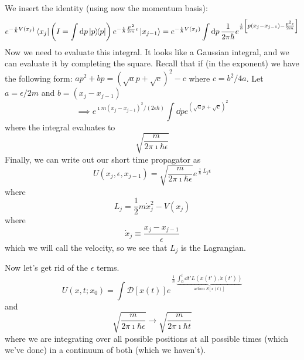 \documentclass[a4paper,twoside,master.tex]{subfiles}
\begin{document}
We insert the identity (using now the momentum basis):
\begin{equation}
    e^{- \frac{\imath}{\hbar} V(x_j)} \bra{x_j}\left( I = \int \dd{p} \op{p} \right) e^{- \frac{\imath}{\hbar} \frac{P^2}{2m} \epsilon} \ket{x_{j-1}} = e^{- \frac{\imath}{\hbar} V(x_j)} \int \dd{p} \frac{1}{2 \pi \hbar} e^{\frac{\imath}{\hbar} \left[ p(x_j-x_{j-1}) - \frac{p^2\epsilon}{2m} \right]}
\end{equation}
Now we need to evaluate this integral. It looks like a Gaussian integral, and we can evaluate it by completing the square. Recall that if (in the exponent) we have the following form: $ a p^2 + b p = (\sqrt{a} p + \sqrt{c})^2-c $ where $ c = b^2 / 4a $. Let $ a = \epsilon/2m $ and $ b = (x_j-x_{j-1}) $
\begin{equation}
    \implies e^{\imath m(x_j-x_{j-1})^2 / (2 \epsilon \hbar) } \int \dd{p} e^{(\sqrt{a} p + \sqrt{c})^2}
\end{equation}
where the integral evaluates to
\begin{equation}
    \sqrt{\frac{m}{2\pi\imath\hbar\epsilon}}
\end{equation}
Finally, we can write out our short time propagator as
\begin{equation}
    U(x_j,\epsilon,x_{j-1}) = \sqrt{\frac{m}{2\pi\imath\hbar\epsilon}} e^{ \frac{\imath}{\hbar} L_j \epsilon}
\end{equation}
where
\begin{equation}
    L_j = \frac{1}{2} m \dot{x}_j^2 - V(x_j)
\end{equation}
where
\begin{equation}
    \dot{x}_j \equiv \frac{x_j-x_{j-1}}{\epsilon}
\end{equation}
which we will call the velocity, so we see that $ L_j $ is the Lagrangian.

Now let's get rid of the $ \epsilon $ terms.
\begin{equation}
    U(x,t;x_0) = \int \mathscr{D}[x(t)] e^{\frac{\imath}{\hbar} \underbrace{\int_0^t \dd{t'} L(x(t'),\dot{x}(t'))}_{\text{action } S[x(t)] }}
\end{equation}
and
\begin{equation}
    \sqrt{\frac{m}{2\pi\imath\hbar\epsilon}} \to \sqrt{\frac{m}{2\pi\imath\hbar t}}
\end{equation}
where we are integrating over all possible positions at all possible times (which we've done) in a continuum of both (which we haven't).
\end{document}
